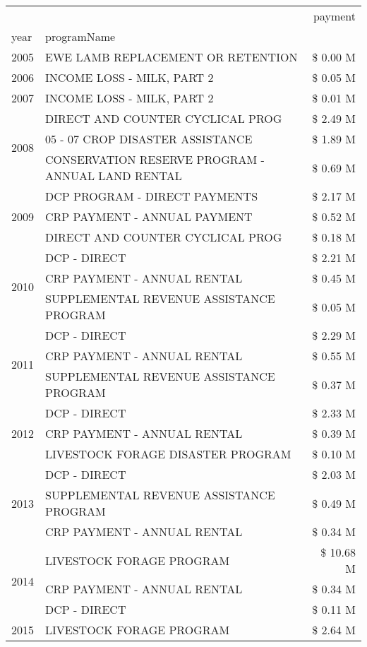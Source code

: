 \begin{tabular}{llr}
\toprule
 &  & payment \\
year & programName &  \\
\midrule
2005 & EWE LAMB REPLACEMENT OR RETENTION & \$ 0.00 M \\
\cline{1-3}
2006 & INCOME LOSS - MILK, PART 2 & \$ 0.05 M \\
\cline{1-3}
2007 & INCOME LOSS - MILK, PART 2 & \$ 0.01 M \\
\cline{1-3}
\multirow[t]{3}{*}{2008} & DIRECT AND COUNTER CYCLICAL PROG & \$ 2.49 M \\
 & 05 - 07 CROP DISASTER ASSISTANCE & \$ 1.89 M \\
 & CONSERVATION RESERVE PROGRAM - ANNUAL LAND RENTAL & \$ 0.69 M \\
\cline{1-3}
\multirow[t]{3}{*}{2009} & DCP PROGRAM - DIRECT PAYMENTS & \$ 2.17 M \\
 & CRP PAYMENT - ANNUAL PAYMENT & \$ 0.52 M \\
 & DIRECT AND COUNTER CYCLICAL PROG & \$ 0.18 M \\
\cline{1-3}
\multirow[t]{3}{*}{2010} & DCP - DIRECT & \$ 2.21 M \\
 & CRP PAYMENT - ANNUAL RENTAL & \$ 0.45 M \\
 & SUPPLEMENTAL REVENUE ASSISTANCE PROGRAM & \$ 0.05 M \\
\cline{1-3}
\multirow[t]{3}{*}{2011} & DCP - DIRECT & \$ 2.29 M \\
 & CRP PAYMENT - ANNUAL RENTAL & \$ 0.55 M \\
 & SUPPLEMENTAL REVENUE ASSISTANCE PROGRAM & \$ 0.37 M \\
\cline{1-3}
\multirow[t]{3}{*}{2012} & DCP - DIRECT & \$ 2.33 M \\
 & CRP PAYMENT - ANNUAL RENTAL & \$ 0.39 M \\
 & LIVESTOCK FORAGE DISASTER PROGRAM & \$ 0.10 M \\
\cline{1-3}
\multirow[t]{3}{*}{2013} & DCP - DIRECT & \$ 2.03 M \\
 & SUPPLEMENTAL REVENUE ASSISTANCE PROGRAM & \$ 0.49 M \\
 & CRP PAYMENT - ANNUAL RENTAL & \$ 0.34 M \\
\cline{1-3}
\multirow[t]{3}{*}{2014} & LIVESTOCK FORAGE PROGRAM & \$ 10.68 M \\
 & CRP PAYMENT - ANNUAL RENTAL & \$ 0.34 M \\
 & DCP - DIRECT & \$ 0.11 M \\
\cline{1-3}
\multirow[t]{3}{*}{2015} & LIVESTOCK FORAGE PROGRAM & \$ 2.64 M \\

\end{tabular}
